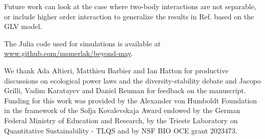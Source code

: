 \documentclass[
 prl,
 twocolumn,
 amsmath,
 amssymb,
 aps,
]{revtex4-2}
\begin{document}
Future work can look at the case where two-body interactions are not separable, or include higher order interaction to generalize the results in Ref. \cite{Gibbs2022} based on the GLV model. 

\medskip

The Julia code used for simulations is available at \url{www.github.com/msmerlak/beyond-may}.

\medskip

\begin{acknowledgments}
We thank Ada Altieri, Matthieu Barbier and Ian Hatton for productive discussions on ecological power laws and the diversity-stability debate and Jacopo Grilli, Vadim Karatayev and Daniel Reuman for feedback on the manuscript.
Funding for this work was provided by the Alexander von Humboldt Foundation in the framework of the Sofja Kovalevskaja Award endowed by the German Federal Ministry of Education and Research, by the Trieste Laboratory on Quantitative Sustainability - TLQS and by NSF BIO OCE grant 2023473.
\end{acknowledgments}

\medskip



\end{document}
